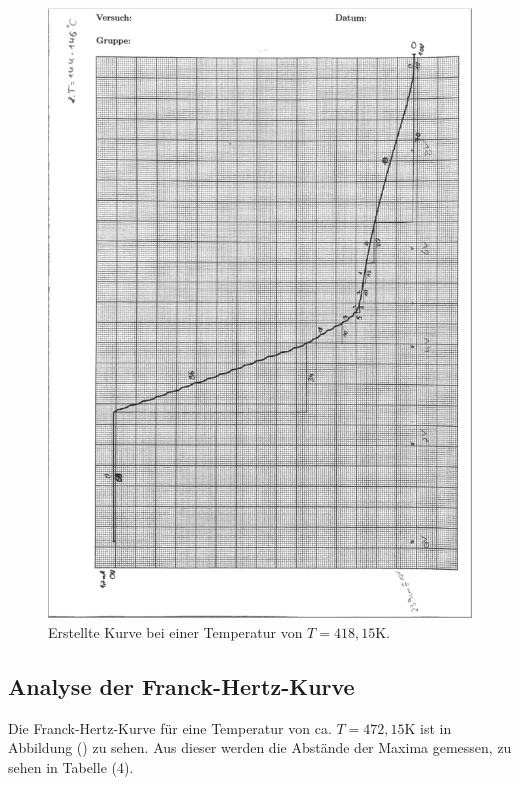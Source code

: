 \begin{figure}[H]
  \centering
  \includegraphics{b.PNG}
  \caption{Erstellte Kurve bei einer Temperatur von $T=418,15$K.}
  \label{fig:plot}
\end{figure}

\subsection{Analyse der Franck-Hertz-Kurve}
Die Franck-Hertz-Kurve für eine Temperatur von ca. $T=472,15 \si{\K}$ ist in Abbildung () zu sehen.
Aus dieser werden die Abstände der Maxima gemessen, zu sehen in Tabelle (4).

